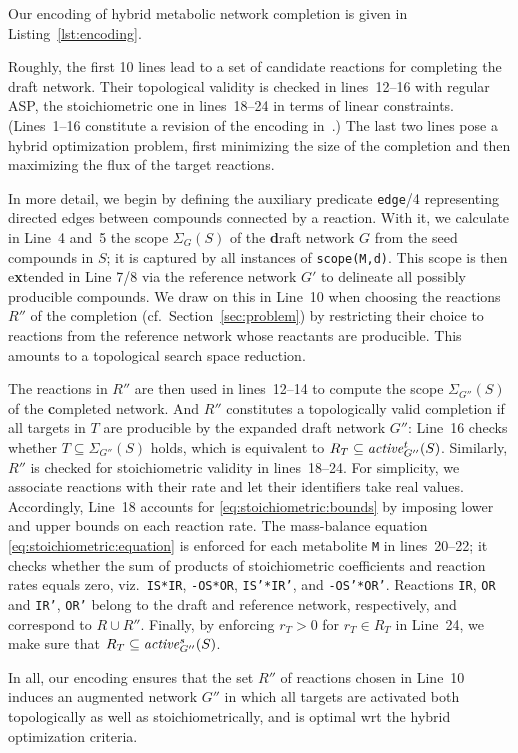 Our encoding of hybrid metabolic network completion is given in Listing~\ref{lst:encoding}.
%

%
Roughly,
the first 10 lines lead to a set of candidate reactions for completing the draft network.
Their topological validity is checked in lines~12--16 with regular ASP,
the stoichiometric one in lines~18--24 in terms of linear constraints.
(Lines~1--16 constitute a revision of the encoding in~\citep{schthi09a}.)
The last two lines pose a hybrid optimization problem,
first minimizing the size of the completion and then
maximizing the flux of the target reactions.%

In more detail,
we begin by defining the auxiliary predicate \texttt{edge}/4 representing directed edges between compounds connected by a reaction.
With it,
we calculate in Line~4 and~5 the scope $\Sigma_{G}(S)$ of the \textbf{d}raft network $G$ from the seed compounds in $S$;
it is captured by all instances of \texttt{scope(M,d)}.
This scope is then e\textbf{x}tended in Line 7/8 via the reference network $G'$ to delineate all possibly producible compounds.
We draw on this in Line~10 when choosing the reactions $R''$ of the completion (cf.\ Section~\ref{sec:problem})
by restricting their choice to reactions from the reference network whose reactants are producible.
This amounts to a topological search space reduction.

The reactions in $R''$ are then used in lines~12--14 to compute the scope $\Sigma_{G''}(S)$ of the \textbf{c}ompleted network.
And $R''$ constitutes a topologically valid completion if all targets in $T$ are producible by the expanded draft network $G''$:
Line~16 checks whether $T\subseteq\Sigma_{G''}(S)$ holds, which is equivalent to $R_T\subseteq\mathit{active}^{t}_{G''}(S)$.
%
Similarly, $R''$ is checked for stoichiometric validity in lines~18--24.
For simplicity, we associate reactions with their rate and let their identifiers take real values.
Accordingly, Line~18 accounts for \eqref{eq:stoichiometric:bounds} by imposing lower and upper bounds on each reaction rate.
%
The mass-balance equation \eqref{eq:stoichiometric:equation} is enforced for each metabolite \texttt{M} in lines~20--22;
it checks whether the sum of products of stoichiometric coefficients and reaction rates equals zero,
viz.\ \texttt{IS*IR}, \texttt{-OS*OR}, \texttt{IS'*IR'}, and \texttt{-OS'*OR'}.
Reactions \texttt{IR}, \texttt{OR} and \texttt{IR'}, \texttt{OR'} belong to the draft and reference network, respectively,
and correspond to $R\cup R''$.
%
Finally, by enforcing $r_T>0$ for $r_T\in R_T$ in Line~24,
we make sure that $R_T\subseteq\mathit{active}^{s}_{G''}(S)$.

In all, our encoding ensures that the set $R''$ of reactions chosen in Line~10 induces an augmented network $G''$
in which all targets are activated both topologically as well as stoichiometrically,
and is optimal wrt the hybrid optimization criteria.

